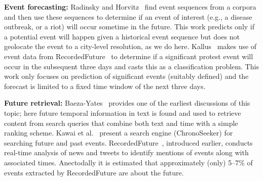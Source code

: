 {\bf Event forecasting:} 
Radinsky and Horvitz~\cite{Radinsky:2013:MWP} find event sequences from a corpora and then use these sequences to determine if 
an event of interest (e.g., a disease outbreak, or a riot)
will occur sometime in the future. This work predicts only if a potential event will happen given a historical event sequence
but does not geolocate the event to a city-level resolution, as we do here.
Kallus~\cite{nathankallus} makes use of event data from 
RecordedFuture~\cite{recordedFuture} to determine if a  significant protest event will occur in 
the subsequent three days and casts this as a classification problem.
This work only focuses on prediction of significant events (suitably defined) and
the forecast is limited to a fixed time window
of the next three days. 
%

{\bf Future retrieval:}
Baeza-Yates~\cite{baeza2005searching} provides one of the earliest discussions
of this topic; here future temporal information in text is found and used to retrieve content from search queries that 
combine both text and time with a simple ranking scheme. 
Kawai et al.~\cite{Kawai:2010:CSE} present a search engine (ChronoSeeker) for searching 
future and past events.
RecordedFuture~\cite{recordedFuture}, introduced earlier, conducts
real-time analysis of news and tweets to identify mentions of events along with associated times. Anectodally it 
is estimated that approximately (only) 5--7\% of events extracted 
by RecordedFuture are about the future.
\iffalse
Tops et al.~\cite{tops2013predicting} aim to classify a tweet talking about an event into discrete time segments and thereby predict the 
`time to event'.
Bosch et al.~\cite{bosch2013estm} use regression techniques to identify the time to an event referred to by a tweet.
Jatowt et al.~\cite{Jatowt:2011:ECE} provide a collective image of the future associated with an entity summarizing all future related information available.
Becker et al.~\cite{Becker:2012:ICP} try to identify more content about known planned events (e.g., a concert) across social media. This work
for instance assumes that we know the event beforehand and aims to identify relevant details of the event.
\fi

